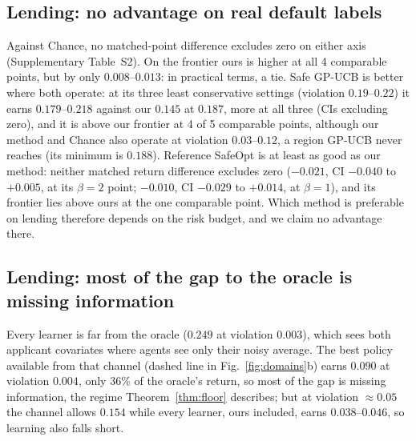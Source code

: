 \documentclass[10pt,a4paper]{article}
\begin{document}
\subsection*{Lending: no advantage on real default labels}
Against Chance, no matched-point difference excludes zero on either axis (Supplementary Table~S2).
On the frontier ours is higher at all 4 comparable points, but by only $0.008$--$0.013$: in practical
terms, a tie. Safe GP-UCB is better where both operate: at its three least conservative settings
(violation $0.19$--$0.22$) it earns $0.179$--$0.218$ against our $0.145$ at $0.187$, more at all three
(CIs excluding zero), and it is above our frontier at 4 of 5 comparable points, although our method and
Chance also operate at violation $0.03$--$0.12$, a region GP-UCB never reaches (its minimum is $0.188$).
Reference SafeOpt is at least as good as our method: neither matched return difference excludes zero ($-0.021$, CI $-0.040$ to $+0.005$, at its $\beta=2$ point; $-0.010$, CI $-0.029$ to $+0.014$, at $\beta=1$), and its frontier lies above ours at the one comparable point. Which method is
preferable on lending therefore depends on the risk budget, and we claim no advantage there.

\subsection*{Lending: most of the gap to the oracle is missing information}
Every learner is far from the oracle ($0.249$ at violation $0.003$), which sees both applicant covariates where agents see only their noisy average. The best policy available from that channel (dashed line in Fig.~\ref{fig:domains}b) earns $0.090$ at violation $0.004$, only 36\% of the oracle's return, so most of the gap is missing information, the regime Theorem~\ref{thm:floor} describes; but at violation $\approx0.05$ the channel allows $0.154$ while every learner, ours included, earns $0.038$--$0.046$, so learning also falls short.

\begin{table}[t]
\caption{\textbf{Ablations on held-out seeds.} ``Frontier'': at how many of the variant's operating
points (within our violation range) the full method's interpolated return is higher, and the range of
the difference. ``$\alpha=0.15$'': full method minus variant; positive $\Delta$R favours the full
method, and positive $\Delta$V means the full method violates more. Bold: CI excludes zero.}
\label{tab:abl}
\centering
\resizebox{\linewidth}{!}{}
\end{table}
\end{document}
